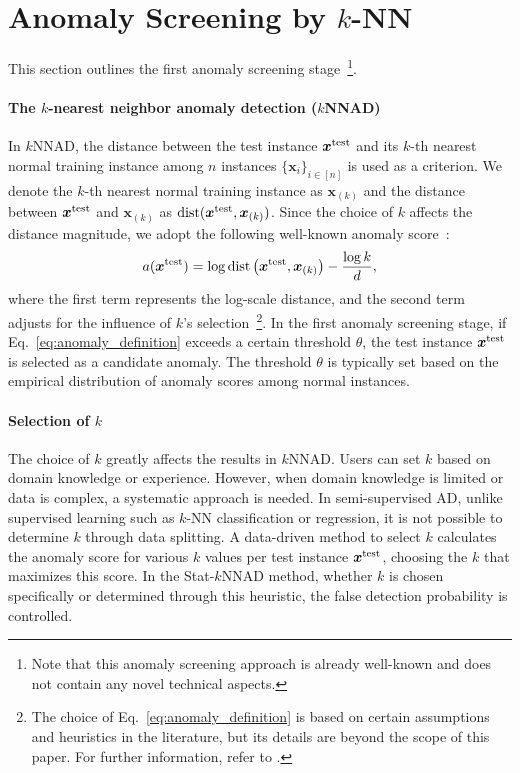 \section{Anomaly Screening by $k$-NN}
\label{sec:kNNAD}
%
This section outlines the first anomaly screening stage~\footnote{
%
Note that this anomaly screening approach is already well-known and does not contain any novel technical aspects.
}.

\paragraph{The $k$-nearest neighbor anomaly detection ($k$NNAD)}
%
In $k$NNAD, the distance between the test instance $\bm x^{\rm test}$ and its $k$-th nearest normal training instance among $n$ instances $\{\bm{x}_i\}_{i \in [n]}$ is used as a criterion.  
%
We denote the $k$-th nearest normal training instance as $\bm{x}_{(k)}$ and the distance between $\bm x^{\rm test}$ and $\bm x_{(k)}$ as ${\rm dist}(\bm{x}^{\rm test}, \bm{x}_{(k)})$.  
%
Since the choice of $k$ affects the distance magnitude, we adopt the following well-known anomaly score~\cite{mehrotra2017anomaly}:  
\begin{align}
 \label{eq:anomaly_definition}
 a(\bm x^{\rm test}) = \log {\rm dist}\left(\bm x^{\rm test}, \bm x_{(k)} \right) - \frac{\log k}{d}, 
\end{align}
where the first term represents the log-scale distance, and the second term adjusts for the influence of $k$'s selection~\footnote{The choice of Eq.~\eqref{eq:anomaly_definition} is based on certain assumptions and heuristics in the literature, but its details are beyond the scope of this paper. For further information, refer to \citet{mehrotra2017anomaly}.}.  
%
In the first anomaly screening stage, if Eq.~\eqref{eq:anomaly_definition} exceeds a certain threshold $\theta$, the test instance $\bm x^{\rm test}$ is selected as a candidate anomaly.  
%
The threshold $\theta$ is typically set based on the empirical distribution of anomaly scores among normal instances.

\paragraph{Selection of $k$}
%
The choice of $k$ greatly affects the results in $k$NNAD.
%
Users can set $k$ based on domain knowledge or experience.
%
However, when domain knowledge is limited or data is complex, a systematic approach is needed.
%
In semi-supervised AD, unlike supervised learning such as $k$-NN classification or regression, it is not possible to determine $k$ through data splitting.
%
A data-driven method to select $k$ calculates the anomaly score for various $k$ values per test instance $\bm x^{\rm test}$, choosing the $k$ that maximizes this score.
%
In the Stat-$k$NNAD method, whether $k$ is chosen specifically or determined through this heuristic, the false detection probability is controlled.
